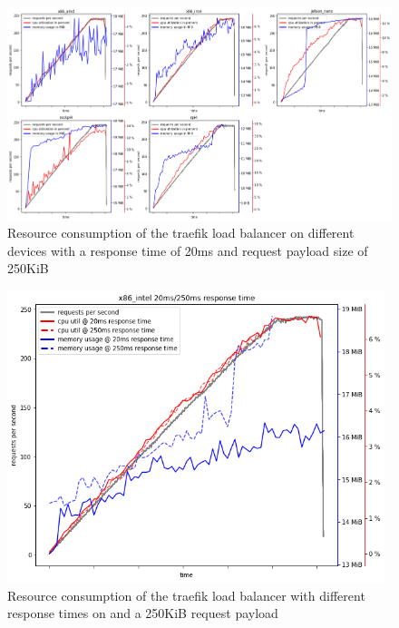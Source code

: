 
\begin{figure}
    \centering
    \includegraphics[width=14cm]{graphics/graphs/lb_resources_by_device.png}
    \caption{Resource consumption of the traefik\cite{traefik} load balancer on different devices with a response time of 20ms and request payload size of 250KiB}
    \label{fig:lb_resources_by_type}
\end{figure}

\begin{figure}
    \centering
    \includegraphics[width=11cm]{graphics/graphs/lb_resources_by_response_time.png}
    \caption{Resource consumption of the traefik\cite{traefik} load balancer with different response times on and a 250KiB request payload}
    \label{fig:lb_resources_by_rt}
\end{figure}
